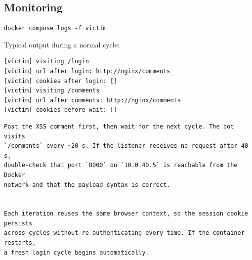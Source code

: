 \subsection{Monitoring}

\begin{lstlisting}
docker compose logs -f victim
\end{lstlisting}

Typical output during a normal cycle:

\begin{lstlisting}
[victim] visiting /login
[victim] url after login: http://nginx/comments
[victim] cookies after login: []
[victim] visiting /comments
[victim] url after comments: http://nginx/comments
[victim] cookies before wait: []
\end{lstlisting}

\begin{lstlisting}
Post the XSS comment first, then wait for the next cycle. The bot visits
`/comments` every ~20 s. If the listener receives no request after 40 s,
double-check that port `8000` on `10.0.40.5` is reachable from the Docker
network and that the payload syntax is correct.


Each iteration reuses the same browser context, so the session cookie persists
across cycles without re-authenticating every time. If the container restarts,
a fresh login cycle begins automatically.
\end{lstlisting}
